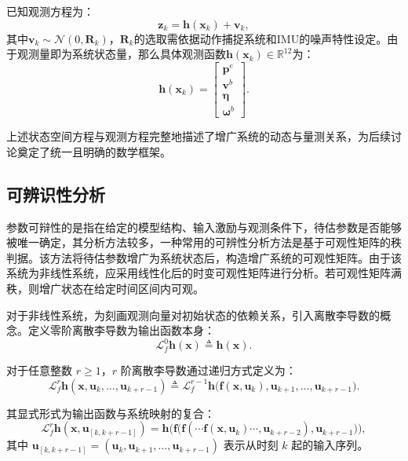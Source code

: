 已知观测方程为：
\begin{equation}
    \boldsymbol{z}_k = \boldsymbol{h}(\boldsymbol{x}_k) + \boldsymbol{v}_k,
\end{equation}
其中$\boldsymbol{v}_k \sim \mathcal{N}(0, \boldsymbol{R}_k)$，$\boldsymbol{R}_k$的选取需依据动作捕捉系统和IMU的噪声特性设定。由于观测量即为系统状态量，那么具体观测函数$\boldsymbol{h}(\boldsymbol{x}_k) \in \mathbb{R}^{12}$为：
\begin{equation}
    \boldsymbol{h}(\boldsymbol{x}_k) = 
    \begin{bmatrix}
        \boldsymbol{p}^e \\
        \boldsymbol{v}^b \\
        \boldsymbol{\eta} \\
        \boldsymbol{\omega}^b
    \end{bmatrix}.
    \label{eq:obs}
\end{equation}

上述状态空间方程与观测方程完整地描述了增广系统的动态与量测关系，为后续讨论奠定了统一且明确的数学框架。

\subsection{可辨识性分析} %
参数可辩性的是指在给定的模型结构、输入激励与观测条件下，待估参数是否能够被唯一确定，其分析方法较多，一种常用的可辨性分析方法是基于可观性矩阵的秩判据。该方法将待估参数增广为系统状态后，构造增广系统的可观性矩阵。由于该系统为非线性系统，应采用线性化后的时变可观性矩阵进行分析。若可观性矩阵满秩，则增广状态在给定时间区间内可观。

对于非线性系统，为刻画观测向量对初始状态的依赖关系，引入离散李导数的概念。定义零阶离散李导数为输出函数本身：
\begin{equation}
    \mathcal{L}_f^0 \boldsymbol{h}(\boldsymbol{x}) \triangleq \boldsymbol{h}(\boldsymbol{x}).
\end{equation}

对于任意整数 $r \ge 1$，$r$ 阶离散李导数通过递归方式定义为：
\begin{equation}
    \mathcal{L}_f^r \boldsymbol{h}(\boldsymbol{x}, \boldsymbol{u}_k, \dots, \boldsymbol{u}_{k+r-1}) 
\triangleq \mathcal{L}_f^{r-1} \boldsymbol{h}\big( \boldsymbol{f}(\boldsymbol{x}, \boldsymbol{u}_k), \boldsymbol{u}_{k+1}, \dots, \boldsymbol{u}_{k+r-1} \big).
\end{equation}

其显式形式为输出函数与系统映射的复合：
\begin{equation}
    \mathcal{L}_f^r \boldsymbol{h}(\boldsymbol{x}, \boldsymbol{u}_{[k,k+r-1]}) = \boldsymbol{h}\Big( \boldsymbol{f}\big( \boldsymbol{f}( \cdots \boldsymbol{f}(\boldsymbol{x}, \boldsymbol{u}_k) \cdots, \boldsymbol{u}_{k+r-2}), \boldsymbol{u}_{k+r-1} \big) \Big),
\end{equation}
其中 $\boldsymbol{u}_{[k,k+r-1]} = (\boldsymbol{u}_k, \boldsymbol{u}_{k+1}, \dots, \boldsymbol{u}_{k+r-1})$ 表示从时刻 $k$ 起的输入序列。

